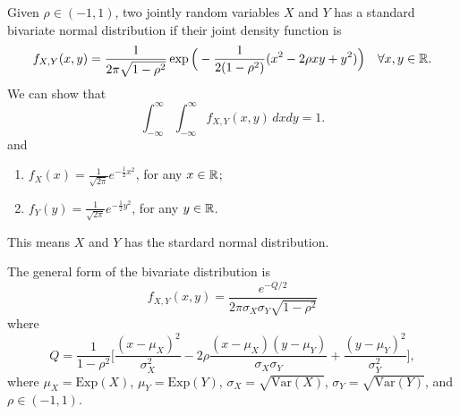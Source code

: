 Given $\rho \in (-1, 1)$, two jointly random variables $X$ and $Y$ has a standard bivariate normal distribution if their joint density function is
    \[
        f_{X, Y} (x, y) = \frac{1}{2\pi \sqrt{1 - \rho^2}} \exp \Big( - \frac{1}{2 (1 - \rho^2)} (x^2 - 2 \rho x y + y^2 ) \Big) \quad \forall x , y \in \mathbb{R} .
    \]
We can show that
    \[
        \int_{-\infty}^\infty \int_{-\infty}^\infty f_{X, Y} (x, y) \, dx dy = 1 .
    \]
and
    \begin{enumerate}[label=\arabic*)]
        \item $f_X (x) = \frac{1}{\sqrt{2\pi}} e^{-\frac{1}{2} x^2}$, for any $x \in \mathbb{R}$;
        \item $f_Y (y) = \frac{1}{\sqrt{2\pi}} e^{-\frac{1}{2} y^2}$, for any $y \in \mathbb{R}$.
    \end{enumerate}
This means $X$ and $Y$ has the stardard normal distribution.

The general form of the bivariate distribution is
    \[
        f_{X, Y} (x, y) = \frac{e^{-Q/2}}{2\pi \sigma_X \sigma_Y \sqrt{1 - \rho^2}}
    \]
where
    \[
        Q = \frac{1}{1 - \rho^2} \Big[ \frac{(x - \mu_X)^2}{\sigma_X^2} - 2 \rho \frac{(x - \mu_X)(y - \mu_Y)}{\sigma_X \sigma_Y} + \frac{(y - \mu_Y)^2}{\sigma_Y^2} \Big] ,
    \]
where $\mu_X = \mathrm{Exp} (X)$, $\mu_Y = \mathrm{Exp} (Y)$, $\sigma_X = \sqrt{\mathrm{Var} (X)}$, $\sigma_Y = \sqrt{\mathrm{Var} (Y)}$, and $\rho \in (-1, 1)$.

